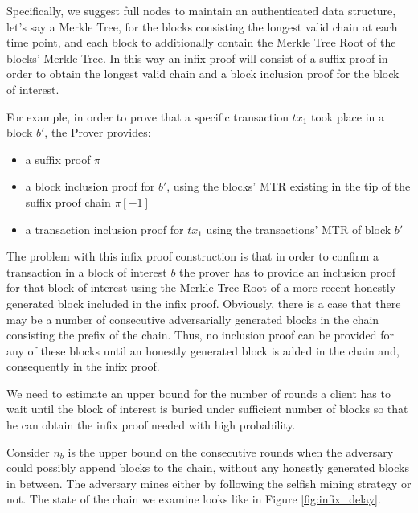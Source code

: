 \documentclass[10pt,a4paper]{article}
\theoremstyle{plain}
\theoremstyle{definition}
\theoremstyle{lemma}
\begin{document}
Specifically, we suggest full nodes to maintain an authenticated data structure, let's say a
Merkle Tree, for the blocks consisting the longest valid chain at each time point, and each
block to additionally contain the Merkle Tree Root of  the blocks' Merkle Tree. In this way an
infix proof will consist of a suffix proof in order to obtain the longest valid chain and a
block inclusion proof for the block of interest.

For example, in order to prove that a specific transaction $tx_1$ took place in a block $b'$,
the Prover provides:
\begin{itemize}
\item a suffix proof $\pi$
\item a block inclusion proof for $b'$, using the blocks' MTR existing in the tip of the
suffix proof chain $\pi[-1]$
\item a transaction inclusion proof for $tx_1$ using the transactions' MTR of block $b'$
\end{itemize}


The problem with this infix proof construction is that in order to confirm a
transaction in a block of interest $b$ the prover has to provide an inclusion
proof for that block of interest using the Merkle Tree Root of a more recent
honestly generated block included in the infix proof. Obviously, there is a case
that there may be a number of consecutive adversarially generated blocks in the
chain   consisting the prefix of the chain. Thus, no inclusion proof can be provided
for any of these blocks until an honestly generated block is added in the chain and,
consequently in the infix proof.

We need to estimate an upper bound for the number of rounds a client has to
wait until the block of interest is buried under sufficient number of blocks
so that he can obtain the infix proof needed with high probability.

Consider $n_b$ is the upper bound on the consecutive rounds when the adversary could
possibly append blocks to the chain, without any honestly generated blocks in
between. The adversary mines either by following the selfish mining strategy or
not. The state of the chain we examine looks like in Figure \ref{fig:infix_delay}.
\end{document}
